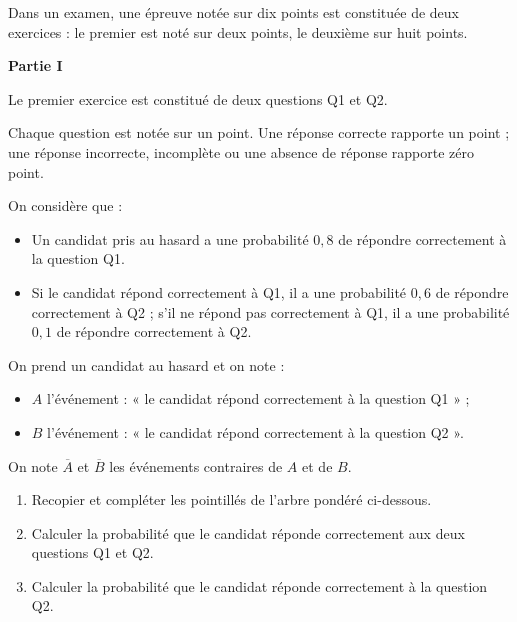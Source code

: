 Dans un examen, une épreuve notée sur dix points est constituée de deux exercices : le premier est noté sur deux points, le deuxième sur huit points.

\medskip

\textbf{\large Partie I}

\medskip

Le premier exercice est constitué de deux questions Q1 et Q2.

\smallskip

Chaque question est notée sur un point. Une réponse correcte rapporte un point ; une réponse incorrecte, incomplète ou une absence de réponse rapporte zéro point.

\smallskip

On considère que :

\begin{itemize}
	\item Un candidat pris au hasard a une probabilité $0,8$ de répondre correctement à la question Q1.
	\item Si le candidat répond correctement à Q1, il a une probabilité $0,6$ de répondre correctement à
	Q2 ; s’il ne répond pas correctement à Q1, il a une probabilité $0,1$ de répondre correctement
	à Q2.
\end{itemize}

On prend un candidat au hasard et on note :

\begin{itemize}
	\item $A$ l’événement : « le candidat répond correctement à la question Q1 » ;
	\item $B$ l’événement : « le candidat répond correctement à la question Q2 ».
\end{itemize}

On note $\overline{A}$ et $\overline{B}$ les événements contraires de $A$ et de $B$.

\begin{enumerate}
	\item Recopier et compléter les pointillés de l’arbre pondéré ci-dessous.
	
	\begin{center}
	\end{center}
	\item Calculer la probabilité que le candidat réponde correctement aux deux questions Q1 et Q2.
	\item Calculer la probabilité que le candidat réponde correctement à la question Q2.
\end{enumerate}

